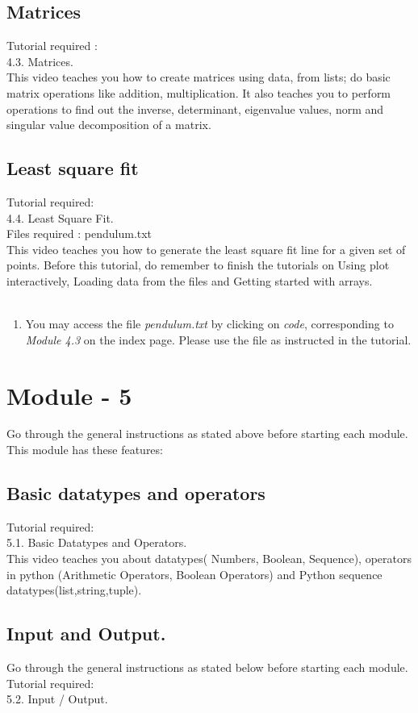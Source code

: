 \documentclass[11pt,twocolumn]{article}
\newenvironment{enumcpt}{\begin{enumerate} \topsep 0pt \partopsep 0pt 
                        \parsep 0pt
                        \itemsep 0pt \leftmargin -1in \rightmargin 0pt
                        }{\end{enumerate}}
\begin{document}
\subsection{Matrices}

Tutorial required : \\ 4.3. Matrices. \\
This video teaches you how to create matrices using data, from lists; do basic matrix operations like addition, multiplication. It also teaches you to perform operations to find out the inverse, determinant, eigenvalue values, norm and singular value decomposition of a matrix.
\subsection{Least square fit}
Tutorial required: \\ 4.4. Least Square Fit. \\
Files required : pendulum.txt \\
This video teaches you how to generate the least square fit line for a given set of points. Before this tutorial, do remember to finish the tutorials on Using plot interactively, Loading data from the files and Getting started with arrays. \\ \\
\begin{enumcpt}
\item You may access the file \emph{pendulum.txt}  by clicking on \emph{code}, corresponding to \emph{Module 4.3} on the index page. Please use the file as instructed in the tutorial. 
\end{enumcpt}

\section{Module - 5}
Go through the general instructions as stated above before starting each module.
This module has these features:
\subsection{Basic datatypes and operators}
Tutorial required: \\ 5.1. Basic Datatypes and Operators. \\
This video teaches you about datatypes( Numbers, Boolean, Sequence), operators in python (Arithmetic Operators, Boolean Operators) and Python sequence datatypes(list,string,tuple).

\subsection{Input and Output.}
Go through the general instructions as stated below before starting each module.
Tutorial required: \\ 5.2. Input / Output. \\
\end{document}
